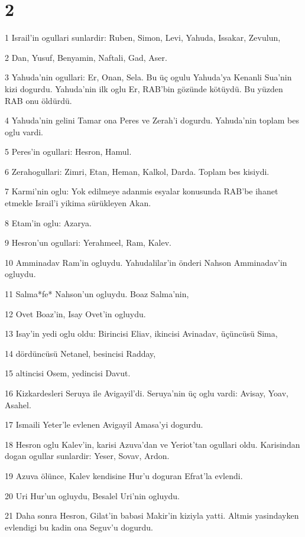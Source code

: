 \chapter{2}

\par 1 Israil'in ogullari sunlardir: Ruben, Simon, Levi, Yahuda, Issakar, Zevulun,
\par 2 Dan, Yusuf, Benyamin, Naftali, Gad, Aser.
\par 3 Yahuda'nin ogullari: Er, Onan, Sela. Bu üç ogulu Yahuda'ya Kenanli Sua'nin kizi dogurdu. Yahuda'nin ilk oglu Er, RAB'bin gözünde kötüydü. Bu yüzden RAB onu öldürdü.
\par 4 Yahuda'nin gelini Tamar ona Peres ve Zerah'i dogurdu. Yahuda'nin toplam bes oglu vardi.
\par 5 Peres'in ogullari: Hesron, Hamul.
\par 6 Zerahogullari: Zimri, Etan, Heman, Kalkol, Darda. Toplam bes kisiydi.
\par 7 Karmi'nin oglu: Yok edilmeye adanmis esyalar konusunda RAB'be ihanet etmekle Israil'i yikima sürükleyen Akan.
\par 8 Etam'in oglu: Azarya.
\par 9 Hesron'un ogullari: Yerahmeel, Ram, Kalev.
\par 10 Amminadav Ram'in ogluydu. Yahudalilar'in önderi Nahson Amminadav'in ogluydu.
\par 11 Salma*fe* Nahson'un ogluydu. Boaz Salma'nin,
\par 12 Ovet Boaz'in, Isay Ovet'in ogluydu.
\par 13 Isay'in yedi oglu oldu: Birincisi Eliav, ikincisi Avinadav, üçüncüsü Sima,
\par 14 dördüncüsü Netanel, besincisi Radday,
\par 15 altincisi Osem, yedincisi Davut.
\par 16 Kizkardesleri Seruya ile Avigayil'di. Seruya'nin üç oglu vardi: Avisay, Yoav, Asahel.
\par 17 Ismaili Yeter'le evlenen Avigayil Amasa'yi dogurdu.
\par 18 Hesron oglu Kalev'in, karisi Azuva'dan ve Yeriot'tan ogullari oldu. Karisindan dogan ogullar sunlardir: Yeser, Sovav, Ardon.
\par 19 Azuva ölünce, Kalev kendisine Hur'u doguran Efrat'la evlendi.
\par 20 Uri Hur'un ogluydu, Besalel Uri'nin ogluydu.
\par 21 Daha sonra Hesron, Gilat'in babasi Makir'in kiziyla yatti. Altmis yasindayken evlendigi bu kadin ona Seguv'u dogurdu.
